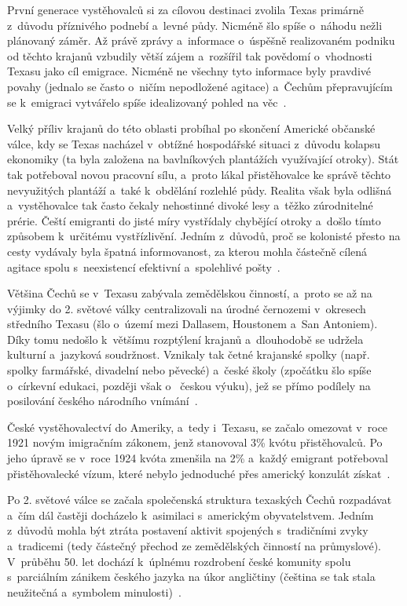 První generace vystěhovalců si za cílovou destinaci zvolila Texas primárně z~důvodu příznivého podnebí a~levné půdy. Nicméně šlo spíše o~náhodu nežli plánovaný záměr. Až právě zprávy a~informace o~úspěšně realizovaném podniku od těchto krajanů vzbudily větší zájem a~rozšířil tak povědomí o~vhodnosti Texasu jako cíl emigrace. Nicméně ne všechny tyto informace byly pravdivé povahy (jednalo se často o~ničím nepodložené agitace) a~Čechům přepravujícím se k~emigraci vytvářelo spíše idealizovaný pohled na věc~\parencite{Eckertova2004}.

Velký příliv krajanů do této oblasti probíhal po skončení Americké občanské válce, kdy se Texas nacházel v~obtížné hospodářské situaci z~důvodu kolapsu ekonomiky (ta byla založena na bavlníkových plantážích využívající otroky). Stát tak potřeboval novou pracovní sílu, a~proto lákal přistěhovalce ke správě těchto nevyužitých plantáží a~také k~obdělání rozlehlé půdy. Realita však byla odlišná a~vystěhovalce tak často čekaly nehostinné divoké lesy a~těžko zúrodnitelné prérie. Čeští emigranti do jisté míry vystřídaly chybějící otroky a~došlo tímto způsobem k~určitému vystřízlivění. Jedním z~důvodů, proč se kolonisté přesto na cesty vydávaly byla špatná informovanost, za kterou mohla částečně cílená agitace spolu s~neexistencí efektivní a~spolehlivé pošty~\parencite{Eckertova2004}.

Většina Čechů se v~Texasu zabývala zemědělskou činností, a~proto se až na výjimky do 2. světové války centralizovali na úrodné černozemi v~okresech středního Texasu (šlo o~území mezi Dallasem, Houstonem a~San Antoniem). Díky tomu nedošlo k~většímu rozptýlení krajanů a~dlouhodobě se udržela kulturní a~jazyková soudržnost. Vznikaly tak četné krajanské spolky (např. spolky farmářské, divadelní nebo pěvecké) a~české školy (zpočátku šlo spíše o~církevní edukaci, později však o~ českou výuku), jež se přímo podílely na posilování českého národního vnímání~\parencite{Eckertova2004}.

České vystěhovalectví do Ameriky, a~tedy i~Texasu, se začalo omezovat v~roce 1921 novým imigračním zákonem, jenž stanovoval 3\% kvótu přistěhovalců. Po jeho úpravě se v~roce 1924 kvóta zmenšila na 2\% a~každý emigrant potřeboval přistěhovalecké vízum, které nebylo jednoduché přes americký konzulát získat~\parencite{Vaculik2009b}.

Po 2. světové válce se začala společenská struktura texaských Čechů rozpadávat a~čím dál častěji docházelo k~asimilaci s~americkým obyvatelstvem. Jedním z~důvodů mohla být ztráta postavení aktivit spojených s~tradičními zvyky a~tradicemi (tedy částečný přechod ze zemědělských činností na průmyslové). V~průběhu 50. let dochází k~úplnému rozdrobení české komunity spolu s~parciálním zánikem českého jazyka na úkor angličtiny (čeština se tak stala neužitečná a~symbolem minulosti)~\parencite{Eckertova2004}.

